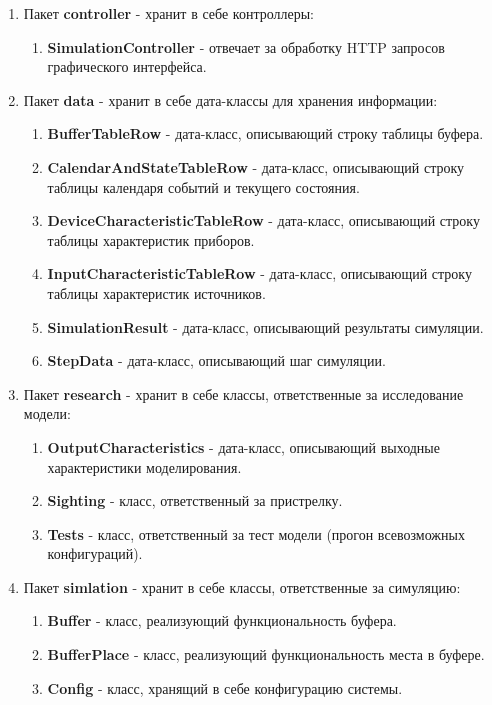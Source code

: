 \documentclass[a4paper, 14pt]{article}
\begin{document}
\begin{enumerate}
	\item Пакет \textbf{controller} - хранит в себе контроллеры:
	\begin{enumerate}
		\item \textbf{SimulationController} - отвечает за обработку HTTP запросов графического интерфейса.
	\end{enumerate}
	\item Пакет \textbf{data} - хранит в себе дата-классы для хранения информации:
	\begin{enumerate}
		\item \textbf{BufferTableRow} - дата-класс, описывающий строку таблицы буфера.
		\item \textbf{CalendarAndStateTableRow} - дата-класс, описывающий строку таблицы календаря событий и текущего состояния.
		\item \textbf{DeviceCharacteristicTableRow} - дата-класс, описывающий строку таблицы характеристик приборов.
		\item \textbf{InputCharacteristicTableRow} - дата-класс, описывающий строку таблицы характеристик источников.
		\item \textbf{SimulationResult} - дата-класс, описывающий результаты симуляции.
		\item \textbf{StepData} - дата-класс, описывающий шаг симуляции.
	\end{enumerate}
	\item Пакет \textbf{research} - хранит в себе классы, ответственные за исследование модели:
	\begin{enumerate}
		\item \textbf{OutputCharacteristics} - дата-класс, описывающий выходные характеристики моделирования.
		\item \textbf{Sighting} - класс, ответственный за пристрелку.
		\item \textbf{Tests} - класс, ответственный за тест модели (прогон всевозможных конфигураций).
	\end{enumerate}
	\item Пакет \textbf{simlation} - хранит в себе классы, ответственные за симуляцию:
	\begin{enumerate}
		\item \textbf{Buffer} - класс, реализующий функциональность буфера.
		\item \textbf{BufferPlace} - класс, реализующий функциональность места в буфере.
		\item \textbf{Config} - класс, хранящий в себе конфигурацию системы.

\end{enumerate}
\end{enumerate}
\end{document}
